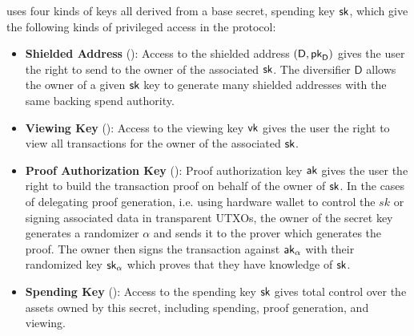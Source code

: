 \begin{center}
    \vspace{1em}
    \begin{mdframed}[leftmargin=0.2\textwidth, rightmargin=0.2\textwidth]
        \begin{center}
        \end{center}
    \end{mdframed}
    \vspace{-1em}
\end{center}

\MantaPay{} uses four kinds of keys all derived from a base secret, spending key ${\textsf{sk}}$, which give the following kinds of privileged access in the protocol:

\begin{itemize}
    \item \textbf{Shielded Address} (\send{}): Access to the shielded address $(\textsf{D}, {\textsf{pk}}_\textsf{D})$ gives the user the right to send  to the owner of the associated ${\textsf{sk}}$. The diversifier $\textsf{D}$ allows the owner of a given ${\textsf{sk}}$ key to generate many shielded addresses with the same backing spend authority.
    \item \textbf{Viewing Key} (\view{}): Access to the viewing key ${\textsf{vk}}$ gives the user the right to view all transactions for the owner of the associated ${\textsf{sk}}$.
    \item \textbf{Proof Authorization Key} (\prove{}): Proof authorization key ${\textsf{ak}}$ gives the user the right to build the transaction proof on behalf of the owner of ${\textsf{sk}}$. 
    In the cases of delegating proof generation, i.e. using hardware wallet to control the $sk$ or signing associated data in transparent UTXOs, 
    the owner of the secret key generates a randomizer $\alpha$ and sends it to the prover which generates the proof. The owner then signs the transaction against ${\textsf{ak}}_\alpha$ with their randomized key ${\textsf{sk}}_\alpha$ which proves that they have knowledge of ${\textsf{sk}}$.
    \item \textbf{Spending Key} (\spend{}): Access to the spending key ${\textsf{sk}}$ gives total control over the assets owned by this secret, including spending, proof generation, and viewing.
\end{itemize}

